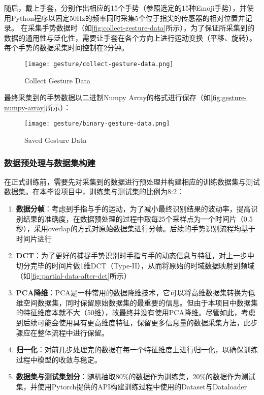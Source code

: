 随后，戴上手套，分别作出相应的15个手势（参照选定的15种Emoji手势），并使用Python程序以固定50Hz的频率同时采集5个位于指尖的传感器的相对位置并记录。
在采集手势数据时（如\autoref{fig:collect-gesture-data}所示），为了保证所采集到的数据的通用性与泛化性，需要让手套在各个方向上进行运动变换（平移、旋转）。每个手势的数据采集时间控制在2分钟。

\begin{figure}[H]
    \centering
    \texttt{[image: gesture/collect-gesture-data.png]}
    \caption{\label{fig:collect-gesture-data}Collect Gesture Data}
\end{figure}

最终采集到的手势数据以二进制Numpy Array的格式进行保存（如\autoref{fig:gesture-numpy-array}所示）：

\begin{figure}[H]
    \centering
    \texttt{[image: gesture/binary-gesture-data.png]}
    \caption{\label{fig:binary-gesture-data}Saved Gesture Data}
\end{figure}

\subsubsection{数据预处理与数据集构建}
在正式训练前，需要先对采集到的数据进行预处理并构建相应的训练数据集与测试数据集。在本毕设项目中，训练集与测试集的比例为8:2：
\begin{enumerate}
    \item {\bfseries 数据分帧}：考虑到手指与手的运动，为了减小最终识别结果的波动率，提高识别结果的准确度，在数据预处理的过程中取每25个采样点为一个时间片（0.5秒），采用overlap的方式对原始数据集进行分帧。后续的手势识别流程均基于时间片进行
    \item {\bfseries DCT}：为了更好的捕捉手势识别时手指与手的动态信息与特征，对上一步中切分完毕的时间片做1维DCT（Type-II），从而将原始的时域数据映射到频域（如\autoref{fig:partial-data-after-dct}所示）
    \item {\bfseries PCA降维}：PCA是一种常用的数据降维技术，它可以将高维数据集转换为低维空间数据集，同时保留原始数据集的最重要的信息。但由于本项目中数据集的特征维度本就不大（50维），故最终并没有使用PCA降维。尽管如此，考虑到后续可能会使用具有更高维度特征，保留更多信息量的数据采集方法，此步骤应在整体流程中进行保留。
    \item {\bfseries 归一化}：对前几步处理完的数据在每一个特征维度上进行归一化，以确保训练过程中模型的收敛与稳定。
    \item {\bfseries 数据集与测试集划分}：随机抽取80\%的数据作为训练集，20\%的数据作为测试集，并使用Pytorch提供的API构建训练过程中使用的Dataset与Dataloader
\end{enumerate}

